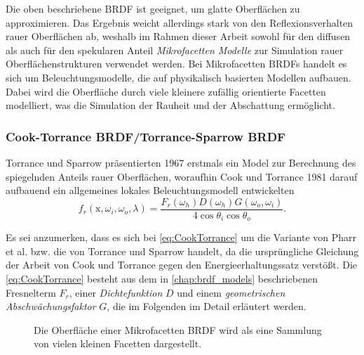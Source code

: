 \documentclass[thesis.tex]{subfiles}
\begin{document}
Die oben beschriebene BRDF ist geeignet, um glatte Oberflächen zu approximieren. Das Ergebnis weicht allerdings stark von den Reflexionsverhalten rauer Oberflächen ab, weshalb im Rahmen dieser Arbeit sowohl für den diffusen als auch für den spekularen Anteil \emph{Mikrofacetten Modelle} zur Simulation rauer Oberflächenstrukturen verwendet werden. Bei Mikrofacetten BRDFs handelt es sich um Beleuchtungsmodelle, die auf physikalisch basierten Modellen aufbauen. Dabei wird die Oberfläche durch viele kleinere zufällig orientierte Facetten modelliert, was die Simulation der Rauheit und der Abschattung ermöglicht.

\subsubsection{Cook-Torrance BRDF/Torrance-Sparrow BRDF}\label{chap:cook_torrance}

Torrance und Sparrow \cite{bib:TorranceSparrow1967} präsentierten 1967 erstmals ein Model zur Berechnung des spiegelnden Anteils rauer Oberflächen, woraufhin Cook und Torrance \cite{bib:CookTorrance1981} 1981 darauf aufbauend ein allgemeines lokales Beleuchtungsmodell entwickelten
\begin{equation}
f_r(\mathrm{x}, \omega_i, \omega_o, \lambda) = \frac{F_r(\omega_h) D(\omega_h) G(\omega_o,\omega_i)}{4 \cos\theta_i \cos\theta_o}.\label{eq:CookTorrance}
\end{equation}

Es sei anzumerken, dass es sich bei \autoref{eq:CookTorrance} um die Variante von Pharr et al. \cite{bib:Pharr2016} bzw. die von Torrance und Sparrow \cite{bib:TorranceSparrow1967} handelt, da die ursprüngliche Gleichung der Arbeit von Cook und Torrance gegen den Energieerhaltungssatz verstößt. Die \autoref{eq:CookTorrance} besteht aus dem in \autoref{chap:brdf_models} beschriebenen Fresnelterm $F_r$, einer \emph{Dichtefunktion} $D$ und einem \emph{geometrischen Abschwächungsfaktor} $G$, die im Folgenden im Detail erläutert werden.

\begin{figure}[ht]
    \centering
    \caption{Die Oberfläche einer Mikrofacetten BRDF wird als eine Sammlung von vielen kleinen Facetten dargestellt.}
    \label{fig:microfacets}
\end{figure}
\end{document}
